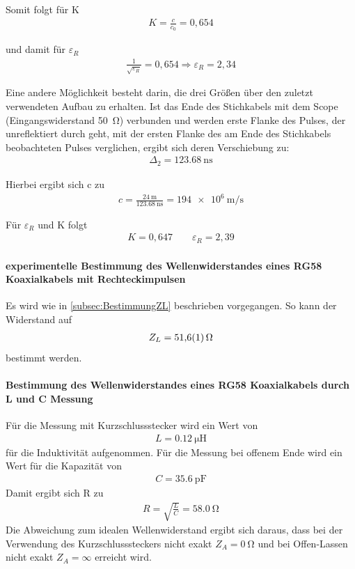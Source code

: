 \documentclass[a4paper,twoside,final]{article}
\begin{document}
Somit folgt für K
\begin{align}
K = \frac{c}{c_0} = 0,654
\end{align}

und damit für $\varepsilon_R$
\begin{align}
\frac{1}{\sqrt{\varepsilon_R}} = 0,654 \Rightarrow \varepsilon_R = 2,34
\end{align}

Eine andere Möglichkeit besteht darin, die drei Größen über den zuletzt verwendeten Aufbau zu erhalten. Ist das Ende des Stichkabels mit dem Scope (Eingangswiderstand \SI{50}{\ohm}) verbunden und werden erste Flanke des Pulses, der unreflektiert durch geht, mit der ersten Flanke des am Ende des Stichkabels beobachteten Pulses verglichen, ergibt sich deren Verschiebung zu:
\begin{align}
\Delta_2  = \SI{123,68}{\nano\second}
\end{align}

Hierbei ergibt sich c zu
\begin{align}
c = \frac{\SI{24}{\meter}}{\SI{123,68}{\nano\second}}= \SI{194e6}{\meter\per\second}
\end{align}

Für $\varepsilon_R$ und K folgt
\begin{align}
K = 0,647 \qquad \varepsilon_R = 2,39
\end{align}

\paragraph{experimentelle Bestimmung des Wellenwiderstandes eines RG58 Koaxialkabels mit Rechteckimpulsen}
Es wird wie in \ref{subsec:BestimmungZL} beschrieben vorgegangen. So kann der Widerstand auf
\begin{align}
Z_L = \SI{51,6 \pm 0,1}{\ohm}
\end{align}
bestimmt werden.

\paragraph{Bestimmung des Wellenwiderstandes eines RG58 Koaxialkabels durch L und C Messung}
Für die Messung mit Kurzschlussstecker wird ein Wert von
\begin{align}
L = \SI{0,12}{\micro\henry}
\end{align}
für die Induktivität aufgenommen. Für die Messung bei offenem Ende wird ein Wert für die Kapazität von
\begin{align}
C = \SI{35,6}{\pico\farad}
\end{align}
Damit ergibt sich R zu
\begin{align}
R = \sqrt{\frac{L}{C}} =  \SI{58,0}{\ohm}
\end{align}
Die Abweichung zum idealen Wellenwiderstand ergibt sich daraus, dass bei der Verwendung des Kurzschlusssteckers nicht exakt $Z_A = \SI{0}{\ohm}$ und bei Offen-Lassen nicht exakt $Z_A = \infty$ erreicht wird.
\end{document}
